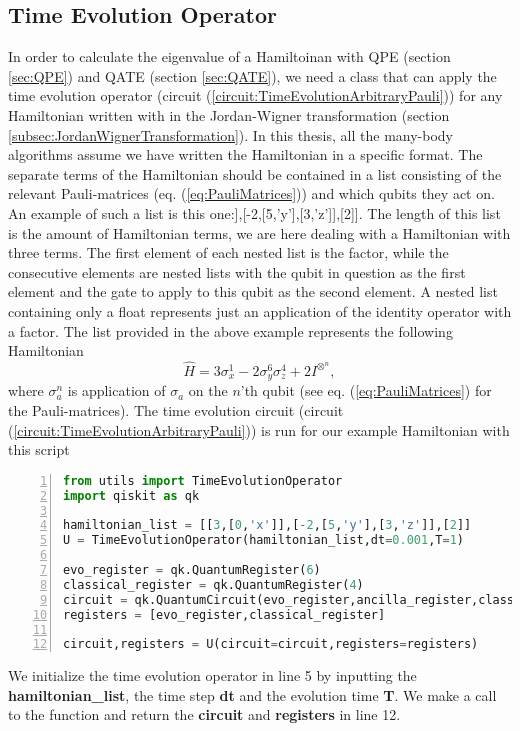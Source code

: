 \subsection{Time Evolution Operator}
\label{subsec:MethodsTimeEvolutionOperator}
In order to calculate the eigenvalue of a Hamiltoinan with QPE (section \ref{sec:QPE}) and QATE (section \ref{sec:QATE}), we need a class that can apply the time evolution operator (circuit (\ref{circuit:TimeEvolutionArbitraryPauli})) for any Hamiltonian written with in the Jordan-Wigner transformation (section \ref{subsec:JordanWignerTransformation}). In this thesis, all the many-body algorithms assume we have written the Hamiltonian in a specific format. The separate terms of the Hamiltonian should be contained in a list consisting of the relevant Pauli-matrices (eq. (\ref{eq:PauliMatrices})) and which qubits they act on. An example of such a list is this one:\newline [[3,[0,'x']],[-2,[5,'y'],[3,'z']],[2]].\newline
The length of this list is the amount of Hamiltonian terms, we are here dealing with a Hamiltonian with three terms. The first element of each nested list is the factor, while the consecutive elements are nested lists with the qubit in question as the first element and the gate to apply to this qubit as the second element. A nested list containing only a float represents just an application of the identity operator with a factor. The list provided in the above example represents the following Hamiltonian
$$ \hat{H} = 3\sigma_x^1 - 2\sigma_y^6\sigma_z^4 + 2I^{\otimes^n}, $$
where $\sigma^n_a$ is application of $\sigma_a$ on the $n$'th qubit (see eq. (\ref{eq:PauliMatrices}) for the Pauli-matrices).
The time evolution circuit (circuit (\ref{circuit:TimeEvolutionArbitraryPauli})) is run for our example Hamiltonian with this script
\begin{lstlisting}[language=Python,numbers=left]
from utils import TimeEvolutionOperator
import qiskit as qk 

hamiltonian_list = [[3,[0,'x']],[-2,[5,'y'],[3,'z']],[2]]
U = TimeEvolutionOperator(hamiltonian_list,dt=0.001,T=1)

evo_register = qk.QuantumRegister(6)
classical_register = qk.QuantumRegister(4)
circuit = qk.QuantumCircuit(evo_register,ancilla_register,classical_register)
registers = [evo_register,classical_register]

circuit,registers = U(circuit=circuit,registers=registers)
\end{lstlisting}
We initialize the time evolution operator in line 5 by inputting the \textbf{hamiltonian\_list}, the time step \textbf{dt} and the evolution time \textbf{T}. We make a call to the function and return the \textbf{circuit} and \textbf{registers} in line 12.
